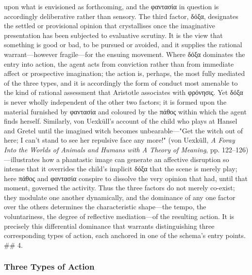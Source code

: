 \documentclass{article}
\begin{document}
upon what is envisioned as forthcoming, and the φαντασία in question is accordingly deliberative rather than sensory. The third factor, δόξα, designates the settled or provisional opinion that crystallises once the imaginative presentation has been subjected to evaluative scrutiny. It is the view that something is good or bad, to be pursued or avoided, and it supplies the rational warrant—however fragile—for the ensuing movement. Where δόξα dominates the entry into action, the agent acts from conviction rather than from immediate affect or prospective imagination; the action is, perhaps, the most fully mediated of the three types, and it is accordingly the form of conduct most amenable to the kind of rational assessment that Aristotle associates with φρόνησις. Yet δόξα is never wholly independent of the other two factors; it is formed upon the material furnished by φαντασία and coloured by the πάθος within which the agent finds herself. Similarly, von Uexküll's account of the child who plays at Hansel and Gretel until the imagined witch becomes unbearable—"Get the witch out of here; I can't stand to see her repulsive face any more!" (von Uexküll, \textit{A Foray Into the Worlds of Animals and Humans with A Theory of Meaning}, pp. 122–126)—illustrates how a phantastic image can generate an affective disruption so intense that it overrides the child's implicit δόξα that the scene is merely play; here πάθος and φαντασία conspire to dissolve the very opinion that had, until that moment, governed the activity. Thus the three factors do not merely co-exist; they modulate one another dynamically, and the dominance of any one factor over the others determines the characteristic shape—the tempo, the voluntariness, the degree of reflective mediation—of the resulting action. It is precisely this differential dominance that warrants distinguishing three corresponding types of action, each anchored in one of the schema's entry points. ## 4. 

\subsubsection*{Three Types of Action}
\end{document}
